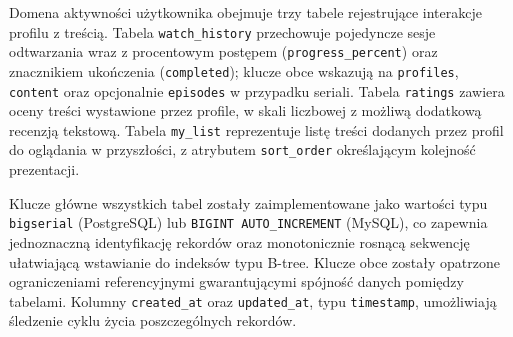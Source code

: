 Domena aktywności użytkownika obejmuje trzy tabele rejestrujące interakcje
profilu z treścią. Tabela \texttt{watch\_history} przechowuje pojedyncze
sesje odtwarzania wraz z procentowym postępem (\texttt{progress\_percent})
oraz znacznikiem ukończenia (\texttt{completed}); klucze obce wskazują na
\texttt{profiles}, \texttt{content} oraz opcjonalnie \texttt{episodes}
w przypadku seriali. Tabela \texttt{ratings} zawiera oceny treści wystawione
przez profile, w skali liczbowej z możliwą dodatkową recenzją tekstową.
Tabela \texttt{my\_list} reprezentuje listę treści dodanych przez profil
do oglądania w przyszłości, z atrybutem \texttt{sort\_order} określającym
kolejność prezentacji.

Klucze główne wszystkich tabel zostały zaimplementowane jako wartości typu
\texttt{bigserial} (PostgreSQL) lub \texttt{BIGINT AUTO\_INCREMENT} (MySQL),
co zapewnia jednoznaczną identyfikację rekordów oraz monotonicznie rosnącą
sekwencję ułatwiającą wstawianie do indeksów typu B-tree. Klucze obce
zostały opatrzone ograniczeniami referencyjnymi gwarantującymi spójność
danych pomiędzy tabelami. Kolumny \texttt{created\_at} oraz \texttt{updated\_at},
typu \texttt{timestamp}, umożliwiają śledzenie cyklu życia poszczególnych
rekordów.
